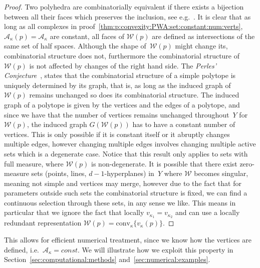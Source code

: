 \documentclass{elsarticle}
\providecommand{\conv}{\text{conv}}
\theoremstyle{remark}
\theoremstyle{definition}
\begin{document}
\begin{proof}
Two polyhedra are combinatorially equivalent if there exists a bijection between all their faces which preserves the inclusion, see e.g.~\cite{Ziegler:1995}.
%
It is clear that as long as all complexes in proof~\ref{thm:p:convexity:PWA:set:constant:num:verts}, $\mathcal A_\kappa(p)=\mathcal A_\kappa$ are constant, all faces of $\mathcal W(p)$ are defined as intersections of the same set of half spaces.
%
Although the shape of~$\mathcal W(p)$ might change its, combinatorial structure does not, furthermore the combinatorial structure of $\mathcal W(p)$ is not affected by changes of the right hand side.
%
The \emph{Perles' Conjecture}~\cite{Kalai:1988}, states that the combinatorial structure of a simple polytope is uniquely determined by its graph, that is, as long as the induced graph of~$\mathcal W(p)$ remains unchanged so does its combinatorial structure.
%
The induced graph of a polytope is given by the vertices and the edges of a polytope, and since we have that the number of vertices remains unchanged throughout~$Y$ for $\mathcal W(p)$, the induced graph $G(\mathcal W(p))$ has to have a constant number of vertices.
%
This is only possible if it is constant itself or it abruptly changes multiple edges, however changing multiple edges involves changing multiple active sets which is a degenerate case.
%
Notice that this result only applies to sets with full measure, where $\mathcal W(p)$ is non-degenerate.
%
It is possible that there exist zero-measure sets (points, lines, $d-1$-hyperplanes) in~$Y$ where $\mathcal W$ becomes singular, meaning not simple
and vertices may merge, however due to the fact that for parameters outside such sets the combinatorial structure is fixed, we can find a  continuous selection through these sets, in any sense we like.
%
This means in particular that we ignore the fact that locally $v_{\kappa_1}=v_{\kappa_2}$ and can
 use a locally redundant representation $\mathcal W(p) = \conv_\kappa\{v_\kappa(p)\}$.
\end{proof}
%
This allows for efficient numerical treatment, since we know how the vertices are defined, i.e.~$\mathcal A_\kappa = const$.
%
We will illustrate how we exploit this property in Section~\ref{sec:computational:methods} and~\ref{sec:numerical:examples}.
%
\end{document}
